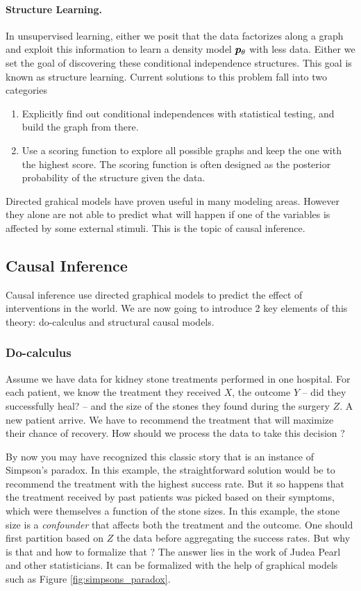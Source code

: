 \paragraph{Structure Learning.}
In unsupervised learning, either we posit that the data factorizes along a graph and exploit this information to learn a density model $\bm{p}_{\theta}$ with less data. Either we set the goal of discovering these conditional independence structures. This goal is known as structure learning. Current solutions to this problem fall into two categories
\begin{enumerate}
    \item Explicitly find out conditional independences with statistical testing, and build the graph from there.
    \item Use a scoring function to explore all possible graphs and keep the one with the highest score. The scoring function is often designed as the posterior probability of the structure given the data.
\end{enumerate}

Directed grahical models have proven useful in many modeling areas. However they alone are not able to predict what will happen if one of the variables is affected by some external stimuli. This is the topic of causal inference.

\subsection{Causal Inference}
\label{ssec:SCM}

Causal inference use directed graphical models to predict the effect of interventions in the world. We are now going to introduce 2 key elements of this theory: do-calculus and structural causal models.

\subsubsection{Do-calculus}
Assume we have data for kidney stone treatments performed in one hospital. 
For each patient, we know the treatment they received $X$, the outcome $Y$ -- did they successfully heal? -- and the size of the stones they found during the surgery $Z$. 
A new patient arrive. We have to recommend the treatment that will maximize their chance of recovery.  
How should we process the data to take this decision ?

By now you may have recognized this classic story that is an instance of Simpson's paradox. 
In this example, the straightforward solution would be to recommend the treatment with the highest success rate. 
But it so happens that the treatment received by past patients was picked based on their symptoms, which were themselves a function of the stone sizes. 
In this example, the stone size is a \textit{confounder} that affects both the treatment and the outcome. 
One should first partition based on $Z$ the data before aggregating the success rates. But why is that and how to formalize that ? The answer lies in the work of Judea Pearl \citep{pearl2009causality} and other statisticians. It can be formalized with the help of graphical models such as Figure \ref{fig:simpsons_paradox}.

